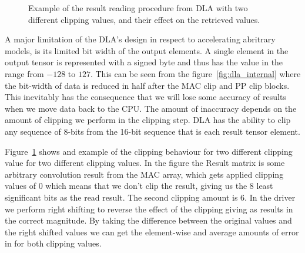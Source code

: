 \documentclass[12pt,a4paper,english
]{tunithesis}
\begin{document}
\begin{figure}
  \caption{Example of the result reading procedure from DLA with two different clipping values, and their effect on the retrieved values.}
  \label{fig:clip-matrix}
\end{figure}


\label{sec:result-width-problem}
A major limitation of the DLA's design in respect to accelerating abritrary models, is its limited bit width of the output elements. A single element in the output tensor is represented with a signed byte and thus has the value in the range from $-128$ to $127$. This can be seen from the figure~\ref{fig:dla_internal} where the bit-width of data is reduced in half after the MAC clip and PP clip blocks. This inevitably has the consequence that we will lose some accuracy of results when we move data back to the CPU. The amount of inaccuracy depends on the amount of clipping we perform in the clipping step. DLA has the ability to clip any sequence of 8-bits from the 16-bit sequence that is each result tensor element.

Figure~\ref{fig:clip-matrix} shows and example of the clipping behaviour for two different clipping value for two different clipping values. In the figure the Result matrix is some arbitrary convolution result from the MAC array, which gets applied clipping values of $0$ which means that we don't clip the result, giving us the 8 least significant bits as the read result. The second clipping amount is $6$. In the driver we perform right shifting to reverse the effect of the clipping giving as results in the correct magnitude. By taking the difference between the original values and the right shifted values we can get the element-wise and average amounts of error in for both clipping values.
\end{document}
